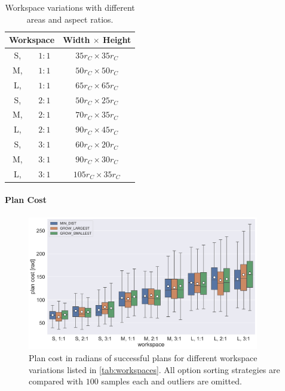 \begin{table}
	\centering
	\begin{tabular}{|c c|c|}
		\hline
		\multicolumn{2}{|c|}{\textbf{Workspace}} & \textbf{Width $\times$ Height}\\
		\hline
		S,& $ 1:1 $ & $35 r_C \times 35 r_C$\\
		\hline
		M,& $ 1:1 $ & $50 r_C \times 50 r_C$ \\
		\hline
		L,& $ 1:1 $ & $65 r_C \times 65 r_C$ \\
		\hline
		S,& $ 2:1 $ & $50 r_C \times 25 r_C$\\
		\hline
		M,& $ 2:1 $ & $70 r_C \times 35 r_C$ \\
		\hline
		L,& $ 2:1 $ & $90 r_C \times 45 r_C$ \\
		\hline
		S,& $ 3:1 $ & $60 r_C \times 20 r_C$\\
		\hline
		M,& $ 3:1 $ & $90 r_C \times 30 r_C$ \\
		\hline
		L,& $ 3:1 $ & $105 r_C \times 35 r_C$ \\
		\hline
	\end{tabular}
	\caption{Workspace variations with different areas and aspect ratios.}
	\label{tab:workspaces}
\end{table}

\paragraph{Plan Cost} 

\begin{figure}
	\centering
	\includegraphics[width=0.9\textwidth]{figures/plots/AFBS_cost.pdf}
	\caption[Plan cost for workspace variations]{Plan cost in radians of successful plans for different workspace variations listed in \autoref{tab:workspaces}. All option sorting strategies are compared with $100$ samples each and outliers are omitted.}
	\label{fig:AFBS_cost}
\end{figure}

